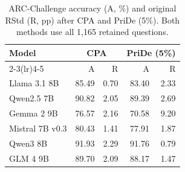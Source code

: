 \begin{table}[htbp]
\centering\small\setlength{\tabcolsep}{4pt}
\caption{ARC-Challenge accuracy (A, \%) and original RStd (R, pp) after CPA and PriDe (5\%). Both methods use all 1,165 retained questions.}
\label{tab:results-pride-arc}
\begin{tabular}{lrrrr}
\toprule
Model & \multicolumn{2}{c}{CPA} & \multicolumn{2}{c}{PriDe (5\%)}\\
\cmidrule(lr){2-3}\cmidrule(lr){4-5}
 & A & R & A & R\\
\midrule
Llama 3.1 8B & 85.49 & 0.70 & 83.40 & 2.33\\
Qwen2.5 7B & 90.82 & 2.05 & 89.39 & 2.69\\
Gemma 2 9B & 76.57 & 2.16 & 70.58 & 9.20\\
Mistral 7B v0.3 & 80.43 & 1.41 & 77.91 & 1.87\\
Qwen3 8B & 91.93 & 2.29 & 91.76 & 0.79\\
GLM 4 9B & 89.70 & 2.09 & 88.17 & 1.47\\
\bottomrule
\end{tabular}
\end{table}
